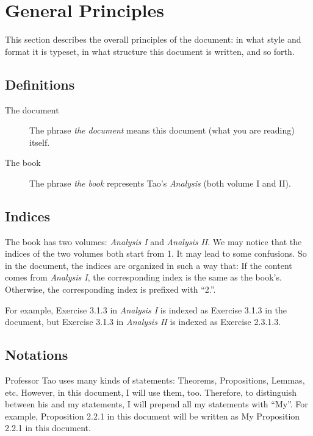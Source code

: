 
\section*{General Principles}
This section describes the overall principles of the document: in what style and format it is typeset,
in what structure this document is written, and so forth.

\subsection*{Definitions}
\begin{description}
\item[The document] The phrase \emph{the document} means this document (what you are reading) itself.
\item[The book] The phrase \emph{the book} represents Tao's \emph{Analysis} (both volume I and II).
\end{description}

\subsection*{Indices}
The book has two volumes: 
\emph{Analysis I} and \emph{Analysis II}. We may notice that the indices of the two volumes both start 
from 1. It may lead to some confusions. So in the document, the indices are organized in such a way that:
If the content comes from \emph{Analysis I}, the corresponding index is the same as the book's. 
Otherwise, the corresponding index is prefixed with ``2.''.

For example, Exercise 3.1.3 in \emph{Analysis I} is indexed as Exercise 3.1.3 in the document, but 
Exercise 3.1.3 in \emph{Analysis II} is indexed as Exercise 2.3.1.3.

\subsection*{Notations}
Professor Tao uses many kinds of statements: Theorems, Propositions, Lemmas, etc. However, in this document, I will use them, too. Therefore, to distinguish between his and my statements,
I will prepend all my statements with ``My''. For example, Proposition 2.2.1 in this document will be written as My Proposition 2.2.1 in this document.

